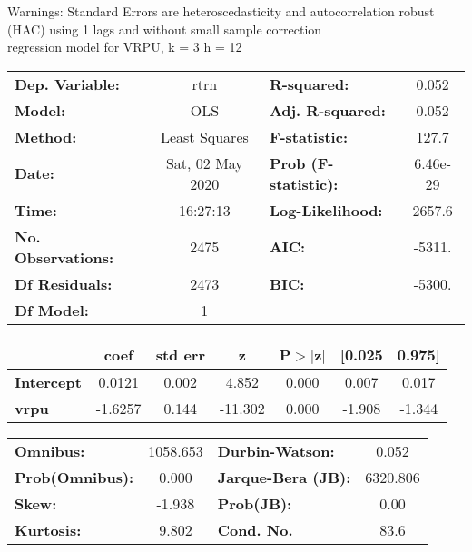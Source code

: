 Warnings: \newline
 [1] Standard Errors are heteroscedasticity and autocorrelation robust (HAC) using 1 lags and without small sample correction\\ 

regression model for VRPU, k = 3 h = 12\begin{center}
\begin{tabular}{lclc}
\toprule
\textbf{Dep. Variable:}    &       rtrn       & \textbf{  R-squared:         } &     0.052   \\
\textbf{Model:}            &       OLS        & \textbf{  Adj. R-squared:    } &     0.052   \\
\textbf{Method:}           &  Least Squares   & \textbf{  F-statistic:       } &     127.7   \\
\textbf{Date:}             & Sat, 02 May 2020 & \textbf{  Prob (F-statistic):} &  6.46e-29   \\
\textbf{Time:}             &     16:27:13     & \textbf{  Log-Likelihood:    } &    2657.6   \\
\textbf{No. Observations:} &        2475      & \textbf{  AIC:               } &    -5311.   \\
\textbf{Df Residuals:}     &        2473      & \textbf{  BIC:               } &    -5300.   \\
\textbf{Df Model:}         &           1      & \textbf{                     } &             \\
\bottomrule
\end{tabular}
\begin{tabular}{lcccccc}
                   & \textbf{coef} & \textbf{std err} & \textbf{z} & \textbf{P$> |$z$|$} & \textbf{[0.025} & \textbf{0.975]}  \\
\midrule
\textbf{Intercept} &       0.0121  &        0.002     &     4.852  &         0.000        &        0.007    &        0.017     \\
\textbf{vrpu}      &      -1.6257  &        0.144     &   -11.302  &         0.000        &       -1.908    &       -1.344     \\
\bottomrule
\end{tabular}
\begin{tabular}{lclc}
\textbf{Omnibus:}       & 1058.653 & \textbf{  Durbin-Watson:     } &    0.052  \\
\textbf{Prob(Omnibus):} &   0.000  & \textbf{  Jarque-Bera (JB):  } & 6320.806  \\
\textbf{Skew:}          &  -1.938  & \textbf{  Prob(JB):          } &     0.00  \\
\textbf{Kurtosis:}      &   9.802  & \textbf{  Cond. No.          } &     83.6  \\
\bottomrule
\end{tabular}
\end{center}

